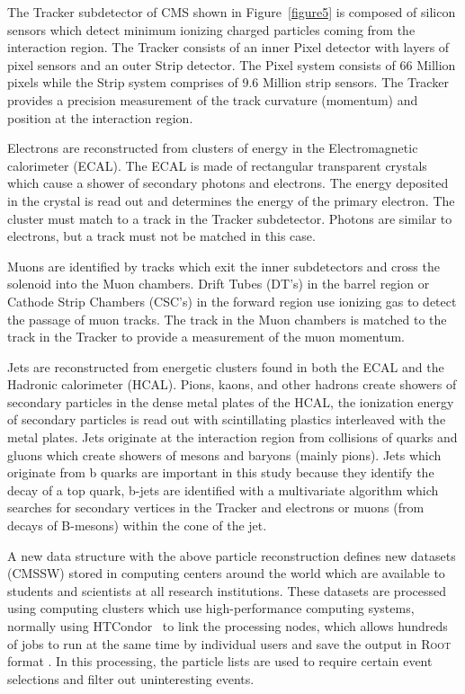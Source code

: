 \documentclass[final,3p]{CSP}
\begin{document}
The Tracker subdetector of CMS shown in Figure~\ref{figure5} is composed of silicon sensors which detect minimum ionizing charged particles coming from the interaction region. The Tracker consists of an inner Pixel detector with layers of pixel sensors and an outer Strip detector. The Pixel system consists of 66 Million pixels while the Strip system comprises of 9.6 Million strip sensors. The Tracker provides a precision measurement of the track curvature (momentum) and position at the interaction region.

Electrons are reconstructed from clusters of energy in the Electromagnetic calorimeter (ECAL). The ECAL is made of rectangular transparent crystals which cause a shower of secondary photons and electrons. The energy deposited in the crystal is read out and determines the energy of the primary electron. The cluster must match to a track in the Tracker subdetector. Photons are similar to electrons, but a track must not be matched in this case.

Muons are identified by tracks which exit the inner subdetectors and cross the solenoid into the Muon chambers. Drift Tubes (DT's) in the barrel region or Cathode Strip Chambers (CSC's) in the forward region use ionizing gas to detect the passage of muon tracks.  The track in the Muon chambers is matched to the track in the Tracker to provide a measurement of the muon momentum.

Jets are reconstructed from energetic clusters found in both the ECAL and the Hadronic calorimeter (HCAL).
Pions, kaons, and other hadrons create showers of secondary particles in the dense metal plates of the HCAL, the ionization energy of secondary particles is read out with scintillating plastics interleaved with the metal plates.  
Jets originate at the interaction region from collisions of quarks and gluons which create showers of mesons and baryons (mainly pions).
Jets which originate from b quarks are important in this study because they identify the decay of a top quark, b-jets are identified with a multivariate algorithm which searches for secondary vertices in the Tracker and electrons or muons (from decays of B-mesons) within the cone of the jet.

A new data structure with the above particle reconstruction defines new  datasets (\textsc{CMSSW}) stored in computing centers around the world which are available to students and scientists at all research institutions.
These  datasets are processed using computing clusters which use high-performance computing systems, normally using HTCondor~\cite{HTCondor} to link the processing nodes, which allows hundreds of jobs to run at the same time by individual users and save the output in \textsc{Root} format \cite{brun2003root}.
In this processing, the particle lists are used to require certain event selections and filter out uninteresting events.
\end{document}
